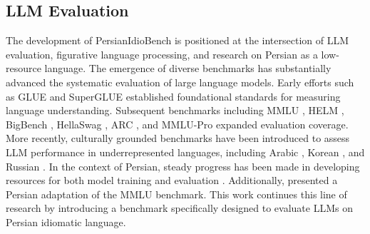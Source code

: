\documentclass[11pt,a4paper]{article}
\begin{document}
\subsection{LLM Evaluation}
The development of PersianIdioBench is positioned at the intersection of LLM evaluation, figurative language processing, and research on Persian as a low-resource language. The emergence of diverse benchmarks has substantially advanced the systematic evaluation of large language models. Early efforts such as GLUE \cite{wang2018glue} and SuperGLUE \cite{wang2019superglue} established foundational standards for measuring language understanding. Subsequent benchmarks including MMLU \cite{hendrycks2020mmlu}, HELM \cite{liang2022holistic}, BigBench \cite{srivastava2022beyond}, HellaSwag \cite{zellers2019hellaswag}, ARC \cite{clark2018arc}, and MMLU-Pro \cite{wang2024mmlupro} expanded evaluation coverage. More recently, culturally grounded benchmarks have been introduced to assess LLM performance in underrepresented languages, including Arabic \cite{qian2024cameleval, nacar2025inclusive}, Korean \cite{kim2024click}, and Russian \cite{vasilev2025ruscode}. In the context of Persian, steady progress has been made in developing resources for both model training \cite{hosseinbeigi2025matina, sabouri2022naab} and evaluation \cite{hosseinbeigi2025persianeval, shamsfard2025farseval}. Additionally, \citet{ghahroodi2024persianmmlu} presented a Persian adaptation of the MMLU benchmark. This work continues this line of research by introducing a benchmark specifically designed to evaluate LLMs on Persian idiomatic language.
\end{document}
